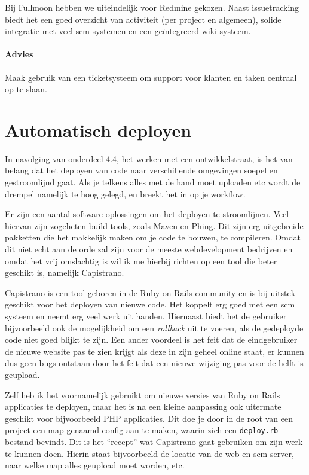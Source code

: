 Bij Fullmoon hebben we uiteindelijk voor Redmine\cite{redmine} gekozen. Naast issuetracking biedt het een goed overzicht van activiteit (per project en algemeen), solide integratie met veel {\sc scm} systemen en een geïntegreerd wiki systeem.

\paragraph{Advies} Maak gebruik van een ticketsysteem om support voor klanten en taken centraal op te slaan. 

\section{Automatisch deployen}

In navolging van onderdeel 4.4, het werken met een ontwikkelstraat, is het van belang dat het deployen van code naar verschillende omgevingen soepel en gestroomlijnd gaat. Als je telkens alles met de hand moet uploaden etc wordt de drempel namelijk te hoog gelegd, en breekt het in op je workflow.

Er zijn een aantal software oplossingen om het deployen te stroomlijnen. Veel hiervan zijn zogeheten build tools, zoals Maven\cite{maven} en Phing\cite{phing}. Dit zijn erg uitgebreide pakketten die het makkelijk maken om je code te bouwen, te compileren. Omdat dit niet echt aan de orde zal zijn voor de meeste webdevelopment bedrijven en omdat het vrij omslachtig is wil ik me hierbij richten op een tool die beter geschikt is, namelijk Capistrano\cite{capistrano}.

Capistrano is een tool geboren in de Ruby on Rails community en is bij uitstek geschikt voor het deployen van nieuwe code. Het koppelt erg goed met een {\sc scm} systeem en neemt erg veel werk uit handen. Hiernaast biedt het de gebruiker bijvoorbeeld ook de mogelijkheid om een \emph{rollback} uit te voeren, als de gedeployde code niet goed blijkt te zijn. Een ander voordeel is het feit dat de eindgebruiker de nieuwe website pas te zien krijgt als deze in zijn geheel online staat, er kunnen dus geen bugs ontstaan door het feit dat een nieuwe wijziging pas voor de helft is geupload.

Zelf heb ik het voornamelijk gebruikt om nieuwe versies van Ruby on Rails applicaties te deployen, maar het is na een kleine aanpassing ook uitermate geschikt voor bijvoorbeeld PHP applicaties. Dit doe je door in de root van een project een map genaamd config aan te maken, waarin zich een \texttt{deploy.rb} bestand bevindt. Dit is het ``recept'' wat Capistrano gaat gebruiken om zijn werk te kunnen doen. Hierin staat bijvoorbeeld de locatie van de web en {\sc scm} server, naar welke map alles geupload moet worden, etc.

